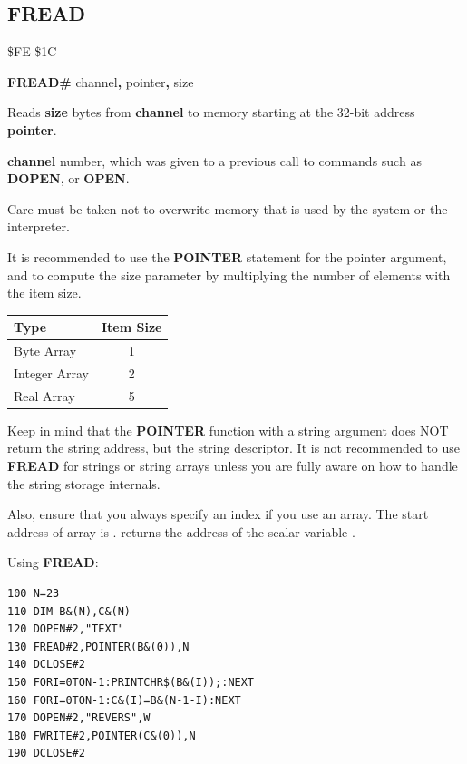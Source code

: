 \subsection{FREAD}
\begin{description}[leftmargin=2cm,style=nextline]
\item [Token:] \$FE \$1C
\item [Format:] {\bf FREAD\#} channel{\bf,} pointer{\bf,} size
\item [Usage:] Reads {\bf size} bytes from {\bf channel} to memory
               starting at the 32-bit address {\bf pointer}.

               {\bf channel} number, which was given to a previous
               call to commands such as {\bf DOPEN}, or {\bf OPEN}.


               Care must be taken not to overwrite memory
               that is used by the system or the interpreter.

               It is recommended to use the {\bf POINTER} statement
               for the pointer argument, and to compute the size parameter
               by multiplying the number of elements with the item size.
\begin{center}
\label{freadtable}
\setlength{\tabcolsep}{1mm}
\begin{tabular}{|l|c|}
\hline
{\bf Type}          & {\bf Item Size} \\
\hline
Byte     Array &  1     \\
Integer  Array &  2     \\
Real     Array &  5     \\
\hline
\end{tabular}
\end{center}

Keep in mind that the {\bf POINTER} function with a string argument
does NOT return the string address, but the string descriptor.
It is not recommended to use {\bf FREAD} for strings or string arrays
unless you are fully aware on how to handle the string storage internals.

Also, ensure that you always specify an index if you use an array.
The start address of array  is .
 returns the address of the scalar variable .

\item [Example:] Using {\bf FREAD}:
\begin{tcolorbox}[colback=black,coltext=white]
\verbatimfont{\codefont}
\begin{verbatim}
100 N=23
110 DIM B&(N),C&(N)
120 DOPEN#2,"TEXT"
130 FREAD#2,POINTER(B&(0)),N
140 DCLOSE#2
150 FORI=0TON-1:PRINTCHR$(B&(I));:NEXT
160 FORI=0TON-1:C&(I)=B&(N-1-I):NEXT
170 DOPEN#2,"REVERS",W
180 FWRITE#2,POINTER(C&(0)),N
190 DCLOSE#2
\end{verbatim}
\end{tcolorbox}
\end{description}

